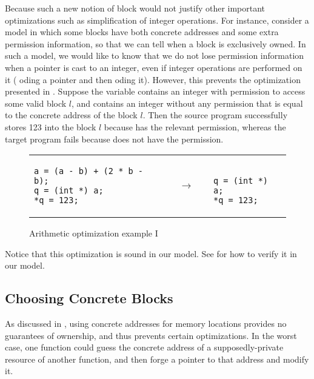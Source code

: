 Because such a new notion of block would not justify other important optimizations such as
simplification of integer operations.  For instance, consider a model in which some blocks have both
concrete addresses and some extra permission information, so that we can tell when a block is
exclusively owned. In such a model, we would like to know that we do not lose permission information
when a pointer is cast to an integer, even if integer operations are performed on it (\eg
{}oding a pointer and then oding it).  However, this prevents the
optimization presented in .  Suppose the variable
 contains an integer with permission to access some valid block $l$, and  contains
an integer without any permission that is equal to the concrete address of the block $l$. Then the
source program successfully stores 123 into the block $l$ because  has the relevant
permission, whereas the target program fails because  does not have the permission.
%
\begin{figure}[t]
\center
\begin{tabular}{lll}
\begin{minipage}{0.4\textwidth}
\begin{verbatim}
a = (a - b) + (2 * b - b);
q = (int *) a;
*q = 123;
\end{verbatim}
\end{minipage}
&
$\quad\rightarrow\quad$
&
\begin{minipage}{0.2\textwidth}
\begin{verbatim}

q = (int *) a;
*q = 123;
\end{verbatim}
\end{minipage}
\end{tabular}
\caption{Arithmetic optimization example I}\label{fig:intptrcast:formal-semantics:arith1}
\end{figure}
%

Notice that this optimization is sound in our model.  See
 for how to verify it in our model.


\subsection{Choosing Concrete Blocks}
\label{sec:intptrcast:formal-semantics:cast}

As discussed in , using concrete addresses for memory locations provides
no guarantees of ownership, and thus prevents certain optimizations. In the worst case, one function
could guess the concrete address of a supposedly-private resource of another function, and then
forge a pointer to that address and modify it.

